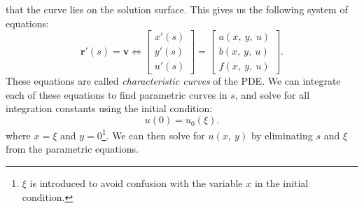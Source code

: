\documentclass{article}
\theoremstyle{definition}
\begin{document}
that the curve lies on the solution surface. This gives us the following
system of equations:
\begin{equation*}
\symbf{r}'\left( s \right) = \symbf{v} \iff \begin{bmatrix}
        x'\left( s \right) \\
        y'\left( s \right) \\
        u'\left( s \right)
    \end{bmatrix}
    = \begin{bmatrix}
        a\left( x,\: y,\: u \right) \\
        b\left( x,\: y,\: u \right) \\
        f\left( x,\: y,\: u \right)
    \end{bmatrix}.
\end{equation*}
These equations are called \textit{characteristic curves} of the PDE.
We can integrate each of these equations to find parametric curves in
\(s\), and solve for all integration constants using the initial
condition:
\begin{equation*}
    u\left( 0 \right) = u_0\left( \xi \right).
\end{equation*}
where \(x = \xi\) and \(y = 0\)\footnote{\(\xi\) is introduced to avoid
confusion with the variable \(x\) in the initial condition.}. We can
then solve for \(u\left( x,\: y \right)\) by eliminating \(s\) and
\(\xi\) from the parametric equations.
\end{document}
